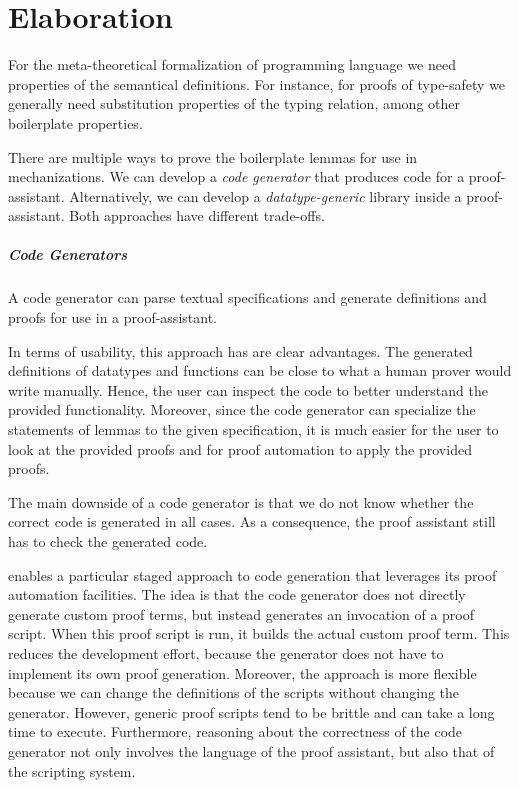 \chapter{Elaboration}\label{ch:elaboration}
For the meta-theoretical formalization of programming language we need
properties of the semantical definitions. For instance, for proofs of
type-safety we generally need substitution properties of the typing relation,
among other boilerplate properties.

There are multiple ways to prove the boilerplate lemmas for use in
mechanizations. We can develop a \emph{code generator} that produces code for a
proof-assistant.  Alternatively, we can develop a \emph{datatype-generic}
library inside a proof-assistant. Both approaches have different trade-offs.


\paragraph{Code Generators}
A code generator can parse textual \Knot specifications and generate
definitions and proofs for use in a proof-assistant. 

In terms of usability, this approach has are clear advantages.
The generated definitions of datatypes and functions can be
close to what a human prover would write manually. Hence, the user can inspect
the code to better understand the provided functionality. Moreover, since the
code generator can specialize the statements of lemmas to the given
specification, it is much easier for the user to look at the provided proofs
and for proof automation to apply the provided proofs.

The main downside of a code generator is that we do not know whether the
correct code is generated in all cases. As a consequence, the proof assistant
still has to check the generated code. 

\Coq enables a particular staged approach to code generation that leverages its
proof automation facilities. The idea is that the code generator does not directly
generate custom proof terms, but instead generates an invocation of a \Coq proof
script. When this proof script is run, it builds the actual custom proof term.
This reduces the development effort, because the generator does not have to
implement its own proof generation. Moreover, the approach is more flexible
because we can change the definitions of the scripts without changing the
generator.
However, generic proof scripts tend to be brittle and can take a
long time to execute. Furthermore, reasoning about the correctness of the code
generator not only involves the language of the proof assistant, but also that
of the scripting system.


